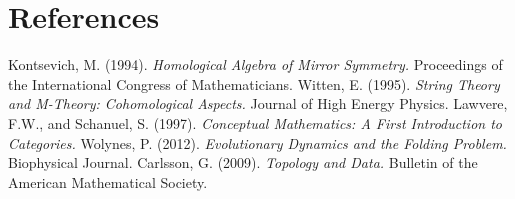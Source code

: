 \documentclass{article}
\begin{document}
\section{References}
\begin{thebibliography}{9}
     Kontsevich, M. (1994). \textit{Homological Algebra of Mirror Symmetry.} Proceedings of the International Congress of Mathematicians.
     Witten, E. (1995). \textit{String Theory and M-Theory: Cohomological Aspects.} Journal of High Energy Physics.
     Lawvere, F.W., and Schanuel, S. (1997). \textit{Conceptual Mathematics: A First Introduction to Categories.}
     Wolynes, P. (2012). \textit{Evolutionary Dynamics and the Folding Problem.} Biophysical Journal.
     Carlsson, G. (2009). \textit{Topology and Data.} Bulletin of the American Mathematical Society.
\end{thebibliography}
\end{document}
